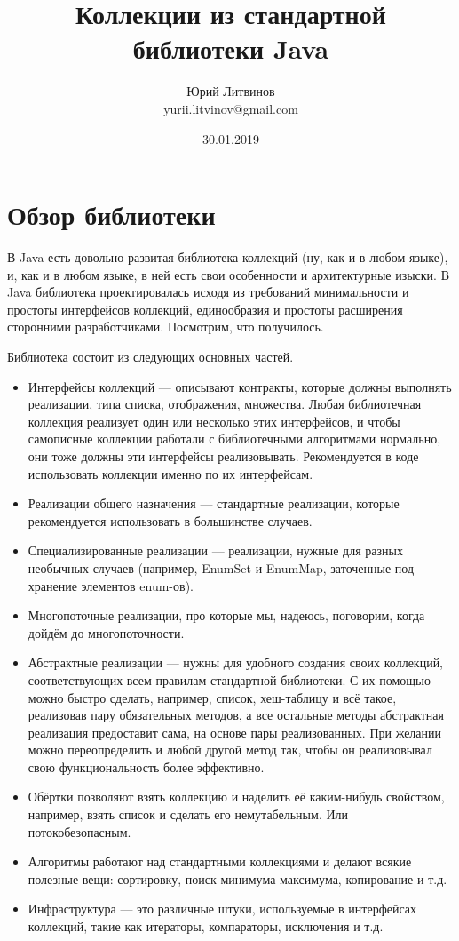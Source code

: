 \documentclass[a5paper]{article}
\title{Коллекции из стандартной библиотеки Java}
\author{Юрий Литвинов\\\small{yurii.litvinov@gmail.com}}
\date{30.01.2019}
\begin{document}
\maketitle
\thispagestyle{empty}

\section{Обзор библиотеки}

В Java есть довольно развитая библиотека коллекций (ну, как и в любом языке), и, как и в любом языке, в ней есть свои особенности и архитектурные изыски. В Java библиотека проектировалась исходя из требований минимальности и простоты интерфейсов коллекций, единообразия и простоты расширения сторонними разработчиками. Посмотрим, что получилось.

Библиотека состоит из следующих основных частей.

\begin{itemize}
	\item Интерфейсы коллекций --- описывают контракты, которые должны выполнять реализации, типа списка, отображения, множества. Любая библиотечная коллекция реализует один или несколько этих интерфейсов, и чтобы самописные коллекции работали с библиотечными алгоритмами нормально, они тоже должны эти интерфейсы реализовывать. Рекомендуется в коде использовать коллекции именно по их интерфейсам.
	\item Реализации общего назначения --- стандартные реализации, которые рекомендуется использовать в большинстве случаев.
	\item Специализированные реализации --- реализации, нужные для разных необычных случаев (например, EnumSet и EnumMap, заточенные под хранение элементов enum-ов).
	\item Многопоточные реализации, про которые мы, надеюсь, поговорим, когда дойдём до многопоточности.
	\item Абстрактные реализации --- нужны для удобного создания своих коллекций, соответствующих всем правилам стандартной библиотеки. С их помощью можно быстро сделать, например, список, хеш-таблицу и всё такое, реализовав пару обязательных методов, а все остальные методы абстрактная реализация предоставит сама, на основе пары реализованных. При желании можно переопределить и любой другой метод так, чтобы он реализовывал свою функциональность более эффективно.
	\item Обёртки позволяют взять коллекцию и наделить её каким-нибудь свойством, например, взять список и сделать его немутабельным. Или потокобезопасным.
	\item Алгоритмы работают над стандартными коллекциями и делают всякие полезные вещи: сортировку, поиск минимума-максимума, копирование и т.д.
	\item Инфраструктура --- это различные штуки, используемые в интерфейсах коллекций, такие как итераторы, компараторы, исключения и т.д.
\end{itemize}
\end{document}
